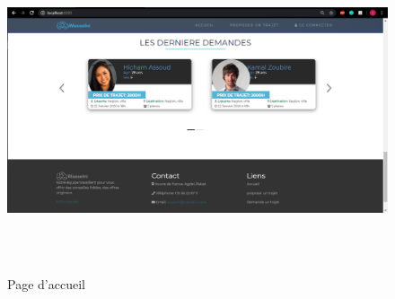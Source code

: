 \documentclass[a4paper]{report}
\begin{document}
\begin{spacing}{2}
\begin{figure}[!ht]
\begin{center}
\includegraphics[height=9.5cm]{accueil4.png}
\end{center}
\caption[Page d'accueil]{Page d'accueil}
\end{figure}

\end{spacing}
\end{document}
